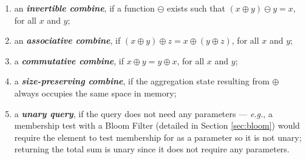 \begin{enumerate}
    \item  an \textbf{\textit{invertible combine}}, if a function $\ominus$ exists such that $(x \oplus y) \ominus y = x$, for all $x$ and $y$;
    
    \item  an \textbf{\textit{associative combine}}, if $(x \oplus y) \oplus z = x \oplus (y \oplus z)$, for all $x$ and $y$;
    
    \item  a \textbf{\textit{commutative combine}}, if $x \oplus y = y \oplus x$, for all $x$ and $y$;
    
    \item  a \textbf{\textit{size-preserving combine}}, if the aggregation state resulting from $\oplus$ always occupies the same space in memory;
   
    \item  a \textbf{\textit{unary query}}, if the query does not need any parameters --- \textit{e.g.}, a membership test with a Bloom Filter (detailed in Section \ref{sec:bloom}) would require the element to test membership for as a parameter so it is not unary; returning the total sum is unary since it does not require any parameters.
\end{enumerate}

